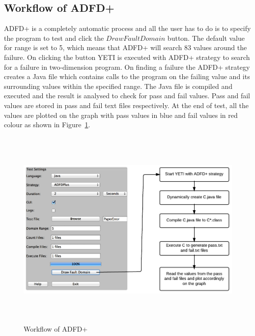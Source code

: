 
\subsection{Workflow of ADFD+}\label{sec:intro6_3}
ADFD+ is a completely automatic process and all the user has to do is to specify the program to test and click the $Draw Fault Domain$ button. The default value for range is set to 5, which means that ADFD+ will search 83 values around the failure. On clicking the button YETI is executed with ADFD+ strategy to search for a failure in two-dimension program. On finding a failure the ADFD+ strategy creates a Java file which contains calls to the program on the failing value and its surrounding values within the specified range. The Java file is compiled and executed and the result is analysed to check for pass and fail values. Pass and fail values are stored in pass and fail text files respectively. At the end of test, all the values are plotted on the graph with pass values in blue and fail values in red colour as shown in Figure~\ref{fig:Workflow}.
\\


\begin{figure}[ht]
\centering
\includegraphics[width= 14cm,height=10cm]{chapter6/adfdPlusWorkflow.png}
\caption{Workflow of ADFD+}
\label{fig:Workflow}
\end{figure}



